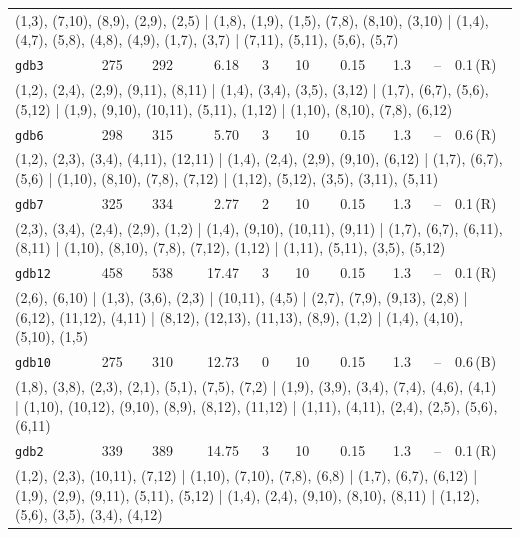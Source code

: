 \begin{longtable}{lrrrrrrrrl}
\multicolumn{10}{p{0.96\linewidth}}{\tiny\raggedright\arraybackslash (1,3), (7,10), (8,9), (2,9), (2,5) | (1,8), (1,9), (1,5), (7,8), (8,10), (3,10) | (1,4), (4,7), (5,8), (4,8), (4,9), (1,7), (3,7) | (7,11), (5,11), (5,6), (5,7)} \\[2pt]
\texttt{gdb3} & 275 & 292 & 6.18 & 3 & 10 & 0.15 & 1.3 & -- & 0.1\,(R) \\
\multicolumn{10}{p{0.96\linewidth}}{\tiny\raggedright\arraybackslash (1,2), (2,4), (2,9), (9,11), (8,11) | (1,4), (3,4), (3,5), (3,12) | (1,7), (6,7), (5,6), (5,12) | (1,9), (9,10), (10,11), (5,11), (1,12) | (1,10), (8,10), (7,8), (6,12)} \\[2pt]
\texttt{gdb6} & 298 & 315 & 5.70 & 3 & 10 & 0.15 & 1.3 & -- & 0.6\,(R) \\
\multicolumn{10}{p{0.96\linewidth}}{\tiny\raggedright\arraybackslash (1,2), (2,3), (3,4), (4,11), (12,11) | (1,4), (2,4), (2,9), (9,10), (6,12) | (1,7), (6,7), (5,6) | (1,10), (8,10), (7,8), (7,12) | (1,12), (5,12), (3,5), (3,11), (5,11)} \\[2pt]
\texttt{gdb7} & 325 & 334 & 2.77 & 2 & 10 & 0.15 & 1.3 & -- & 0.1\,(R) \\
\multicolumn{10}{p{0.96\linewidth}}{\tiny\raggedright\arraybackslash (2,3), (3,4), (2,4), (2,9), (1,2) | (1,4), (9,10), (10,11), (9,11) | (1,7), (6,7), (6,11), (8,11) | (1,10), (8,10), (7,8), (7,12), (1,12) | (1,11), (5,11), (3,5), (5,12)} \\[2pt]
\texttt{gdb12} & 458 & 538 & 17.47 & 3 & 10 & 0.15 & 1.3 & -- & 0.1\,(R) \\
\multicolumn{10}{p{0.96\linewidth}}{\tiny\raggedright\arraybackslash (2,6), (6,10) | (1,3), (3,6), (2,3) | (10,11), (4,5) | (2,7), (7,9), (9,13), (2,8) | (6,12), (11,12), (4,11) | (8,12), (12,13), (11,13), (8,9), (1,2) | (1,4), (4,10), (5,10), (1,5)} \\[2pt]
\texttt{gdb10} & 275 & 310 & 12.73 & 0 & 10 & 0.15 & 1.3 & -- & 0.6\,(B) \\
\multicolumn{10}{p{0.96\linewidth}}{\tiny\raggedright\arraybackslash (1,8), (3,8), (2,3), (2,1), (5,1), (7,5), (7,2) | (1,9), (3,9), (3,4), (7,4), (4,6), (4,1) | (1,10), (10,12), (9,10), (8,9), (8,12), (11,12) | (1,11), (4,11), (2,4), (2,5), (5,6), (6,11)} \\[2pt]
\texttt{gdb2} & 339 & 389 & 14.75 & 3 & 10 & 0.15 & 1.3 & -- & 0.1\,(R) \\
\multicolumn{10}{p{0.96\linewidth}}{\tiny\raggedright\arraybackslash (1,2), (2,3), (10,11), (7,12) | (1,10), (7,10), (7,8), (6,8) | (1,7), (6,7), (6,12) | (1,9), (2,9), (9,11), (5,11), (5,12) | (1,4), (2,4), (9,10), (8,10), (8,11) | (1,12), (5,6), (3,5), (3,4), (4,12)} \\[2pt]

\end{longtable}
